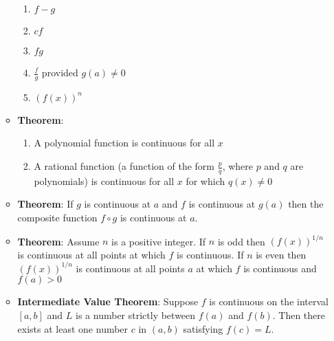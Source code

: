 \documentclass{article}
\begin{document}
\begin{itemize}
\begin{itemize}
\begin{enumerate}
			\item $f - g$
			\item $cf$
			\item $fg$
			\item $\frac{f}{g}$ provided $g(a) \neq 0$
			\item $(f(x))^n$
		\end{enumerate}
		\item \textbf{Theorem}:
		\begin{enumerate}
			\item A polynomial function is continuous for all $x$
			\item A rational function (a function of the form $\frac{p}{q}$, where $p$ and $q$ are polynomials) is continuous for all $x$ for which $q(x) \neq 0$
		\end{enumerate}
		\item \textbf{Theorem}: If $g$ is continuous at $a$ and $f$ is continuous at $g(a)$ then the composite function $f \circ g$ is continuous at $a$. \\
		\item \textbf{Theorem}: Assume $n$ is a positive integer. If $n$ is odd then $(f(x))^{1/n}$ is continuous at all points at which $f$ is continuous. If $n$ is even then $(f(x))^{1/n}$ is continuous at all points $a$ at which $f$ is continuous and $f(a) > 0$ \\
		\item \textbf{Intermediate Value Theorem}: Suppose $f$ is continuous on the interval $[a, b]$ and $L$ is a number strictly between $f(a)$ and $f(b)$. Then there exists at least one number $c$ in $(a,b)$ satisfying $f(c) = L$.
	\end{itemize}
\end{itemize}
\end{document}
